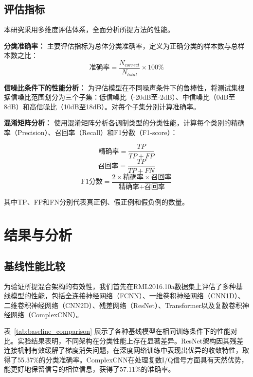 \documentclass{article}
\begin{document}
\subsection{评估指标}

本研究采用多维度评估体系，全面分析所提方法的性能。

\textbf{分类准确率：}
主要评估指标为总体分类准确率，定义为正确分类的样本数与总样本数之比：
\begin{equation}
\text{准确率} = \frac{N_{correct}}{N_{total}} \times 100\%
\end{equation}

\textbf{信噪比条件下的性能分析：}
为评估模型在不同噪声条件下的鲁棒性，将测试集根据信噪比范围划分为三个子集：低信噪比（-20dB至-2dB）、中信噪比（0dB至8dB）和高信噪比（10dB至18dB）。对每个子集分别计算准确率。

\textbf{混淆矩阵分析：}
使用混淆矩阵分析各调制类型的分类性能，计算每个类别的精确率（Precision）、召回率（Recall）和F1分数（F1-score）：

\begin{equation}
\text{精确率} = \frac{TP}{TP + FP}
\end{equation}
\begin{equation}
\text{召回率} = \frac{TP}{TP + FN}
\end{equation}
\begin{equation}
\text{F1分数} = \frac{2 \times \text{精确率} \times \text{召回率}}{\text{精确率} + \text{召回率}}
\end{equation}

其中TP、FP和FN分别代表真正例、假正例和假负例的数量。

\section{结果与分析}

\subsection{基线性能比较}

为验证所提混合架构的有效性，我们首先在RML2016.10a数据集上评估了多种基线模型的性能，包括全连接神经网络（FCNN）、一维卷积神经网络（CNN1D）、二维卷积神经网络（CNN2D）、残差网络（ResNet）、Transformer以及复数卷积神经网络（ComplexCNN）。

表~\ref{tab:baseline_comparison} 展示了各种基线模型在相同训练条件下的性能对比。实验结果表明，不同架构在分类性能上存在显著差异。ResNet架构因其残差连接机制有效缓解了梯度消失问题，在深度网络训练中表现出优异的收敛特性，取得了55.37\%的分类准确率。ComplexCNN在处理复数I/Q信号方面具有天然优势，能更好地保留信号的相位信息，获得了57.11\%的准确率。
\end{document}

